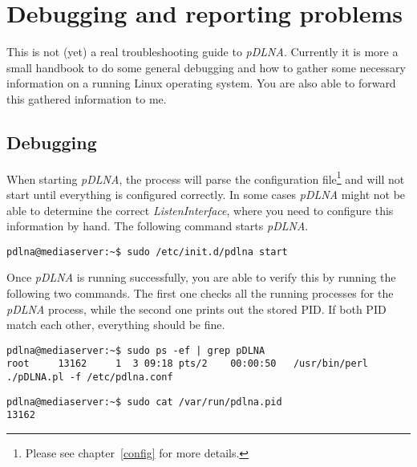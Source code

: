 %
%

\chapter{Debugging and reporting problems}
\label{troubleshooting}

This is not (yet) a real troubleshooting guide to {\em pDLNA}. Currently it is more a small handbook to do some general debugging and how to gather some necessary information on a running Linux operating system. You are also able to forward this gathered information to me.

\section{Debugging}

When starting {\em pDLNA}, the process will parse the configuration file\footnote{Please see chapter~\ref{config} for more details.} and will not start until everything is configured correctly. In some cases {\em pDLNA} might not be able to determine the correct {\em ListenInterface}, where you need to configure this information by hand. The following command starts {\em pDLNA}.
\begin{lstlisting}
pdlna@mediaserver:~$ sudo /etc/init.d/pdlna start
\end{lstlisting}

Once {\em pDLNA} is running successfully, you are able to verify this by running the following two commands. The first one checks all the running processes for the {\em pDLNA} process, while the second one prints out the stored PID. If both PID match each other, everything should be fine.

\begin{lstlisting}
pdlna@mediaserver:~$ sudo ps -ef | grep pDLNA
root     13162     1  3 09:18 pts/2    00:00:50   /usr/bin/perl ./pDLNA.pl -f /etc/pdlna.conf
\end{lstlisting}

\begin{lstlisting}
pdlna@mediaserver:~$ sudo cat /var/run/pdlna.pid
13162
\end{lstlisting}

